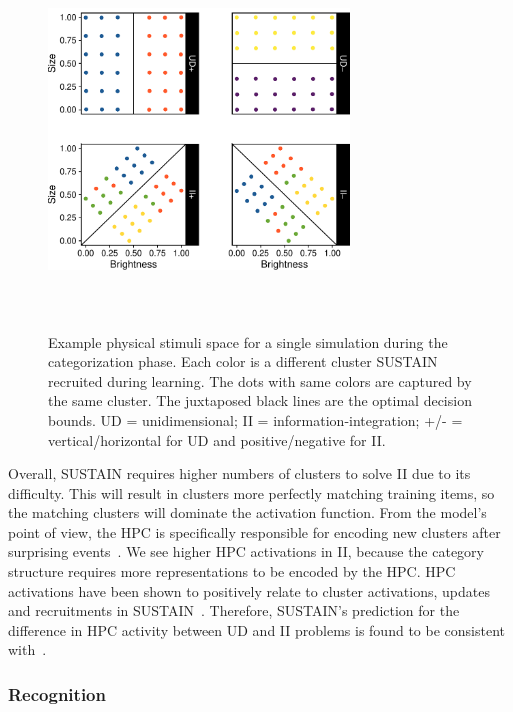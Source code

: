 \documentclass[10pt,letterpaper]{article}
\begin{document}
\begin{figure}[h]
    \includegraphics[width=8cm,
  height=10cm,
  keepaspectratio]{pdf/clusters_single.pdf}
    \caption{Example physical stimuli space for a single simulation during the
        categorization phase. Each color is a different cluster SUSTAIN recruited
        during learning. The dots
        with same colors are captured by the same cluster. The juxtaposed black lines are
    the optimal decision bounds. UD = unidimensional; II = information-integration;
    +/- = vertical/horizontal for UD and positive/negative for II.}
   \label{fig:clusters-stim}
\end{figure}

Overall, SUSTAIN requires higher numbers of clusters to solve II due to its
difficulty. This will result in clusters more perfectly matching training items,
so the matching clusters will dominate the activation function. From the model's
point of view, the HPC is specifically responsible for encoding new clusters
after surprising events~\cite{Love2007}. We see higher HPC activations in
II, because the category structure requires more representations to be encoded
by the HPC. HPC activations have been shown to positively relate to cluster
activations, updates and recruitments in SUSTAIN~\cite{mack2016, mack2018}.
Therefore, SUSTAIN's prediction for the difference in HPC activity between
UD and II problems is found to be consistent with~.

\subsubsection{Recognition}
\end{document}
